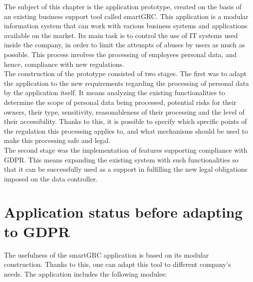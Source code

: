 \documentclass[en, noamssymb]{mgr}
\begin{document}
The subject of this chapter is the application prototype, created on the basis of an existing business support tool called smartGRC. This application is a modular information system that can work with various business systems and applications available on the market. Its main task is to control the use of IT systems used inside the company, in order to limit the attempts of abuses by users as much as possible. This process involves the processing of employees personal data, and hence, compliance with new regulations.\\
\indent The construction of the prototype consisted of two stages. The first was to adapt the application to the new requirements regarding the processing of personal data by the application itself. It means analyzing the existing functionalities to determine the scope of personal data being processed, potential risks for their owners, their type, sensitivity, reasonableness of their processing and the level of their accessibility. Thanks to this, it is possible to specify which specific points of the regulation this processing applies to, and what mechanisms should be used to make this processing safe and legal.\\
\indent The second stage was the implementation of features supporting compliance with GDPR. This means expanding the existing system with such functionalities so that it can be successfully used as a support in fulfilling the new legal obligations imposed on the data controller.

\section{Application status before adapting to GDPR}

The usefulness of the smartGRC application is based on its modular construction. Thanks to this, one can adapt this tool to different company's needs. The application includes the following modules:
\end{document}
